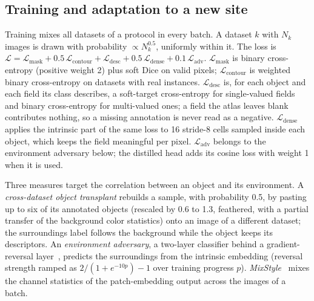 \documentclass[pdflatex,sn-basic,Numbered]{sn-jnl}%
\begin{document}
\subsection{Training and adaptation to a new site}\label{sec:training}
Training mixes all datasets of a protocol in every batch. A dataset $k$ with $N_k$ images is drawn with probability $\propto N_k^{0.5}$, uniformly within it. The loss is $\mathcal{L} = \mathcal{L}_{\mathrm{mask}} + 0.5\,\mathcal{L}_{\mathrm{contour}} + \mathcal{L}_{\mathrm{desc}} + 0.5\,\mathcal{L}_{\mathrm{dense}} + 0.1\,\mathcal{L}_{\mathrm{adv}}$. $\mathcal{L}_{\mathrm{mask}}$ is binary cross-entropy (positive weight 2) plus soft Dice on valid pixels; $\mathcal{L}_{\mathrm{contour}}$ is weighted binary cross-entropy on datasets with real instances. $\mathcal{L}_{\mathrm{desc}}$ is, for each object and each field its class describes, a soft-target cross-entropy for single-valued fields and binary cross-entropy for multi-valued ones; a field the atlas leaves blank contributes nothing, so a missing annotation is never read as a negative. $\mathcal{L}_{\mathrm{dense}}$ applies the intrinsic part of the same loss to 16 stride-8 cells sampled inside each object, which keeps the field meaningful per pixel. $\mathcal{L}_{\mathrm{adv}}$ belongs to the environment adversary below; the distilled head adds its cosine loss with weight 1 when it is used.

Three measures target the correlation between an object and its environment. A \emph{cross-dataset object transplant} rebuilds a sample, with probability 0.5, by pasting up to six of its annotated objects (rescaled by 0.6 to 1.3, feathered, with a partial transfer of the background color statistics) onto an image of a different dataset; the surroundings label follows the background while the object keeps its descriptors. An \emph{environment adversary}, a two-layer classifier behind a gradient-reversal layer~\cite{ganin2015grl}, predicts the surroundings from the intrinsic embedding (reversal strength ramped as $2/(1+e^{-10p})-1$ over training progress $p$). \emph{MixStyle}~\cite{zhou2021mixstyle} mixes the channel statistics of the patch-embedding output across the images of a batch.
\end{document}
